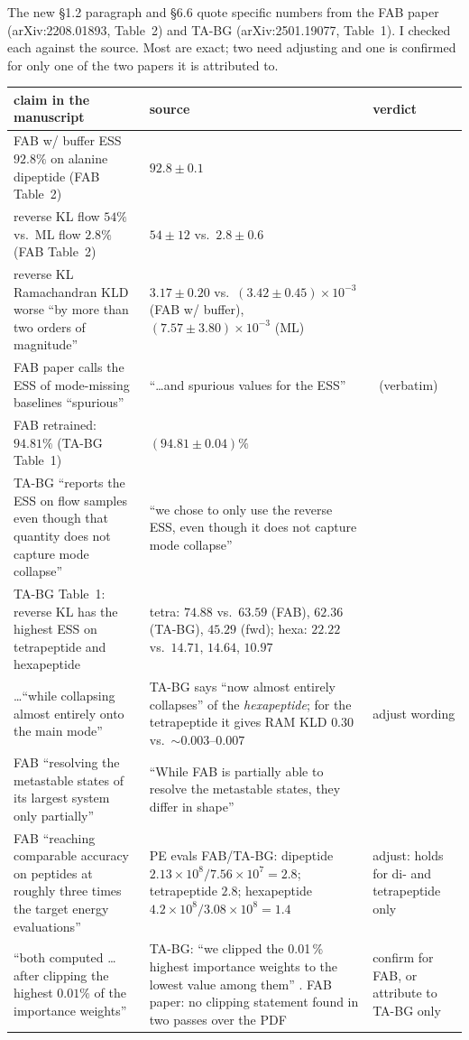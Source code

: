 \documentclass[11pt]{article}
\newcommand{\ok}{\textcolor{green!50!black}{\ding{51}}}
\begin{document}
The new \S1.2 paragraph and \S6.6 quote specific numbers from
the FAB paper (arXiv:2208.01893, Table~2) and TA-BG (arXiv:2501.19077, Table~1).
I checked each against the source. Most are exact; two need adjusting and one
is confirmed for only one of the two papers it is attributed to.

\begin{center}
\small
\setlength{\tabcolsep}{4pt}
\begin{longtable}{@{}p{}p{}p{}@{}}
\toprule
claim in the manuscript & source & verdict \\
\midrule
\endhead
FAB w/ buffer ESS $92.8\%$ on alanine dipeptide (FAB Table~2) & $92.8\pm0.1$ & \ok \\
reverse KL flow $54\%$ vs.\ ML flow $2.8\%$ (FAB Table~2) & $54\pm12$ vs.\ $2.8\pm0.6$ & \ok \\
reverse KL Ramachandran KLD worse ``by more than two orders of magnitude'' & $3.17\pm0.20$ vs.\ $(3.42\pm0.45)\times10^{-3}$ (FAB w/ buffer), $(7.57\pm3.80)\times10^{-3}$ (ML) & \ok \\
FAB paper calls the ESS of mode-missing baselines ``spurious'' & ``\dots and spurious values for the ESS'' & \ok\ (verbatim) \\
FAB retrained: $94.81\%$ (TA-BG Table~1) & $(94.81\pm0.04)\%$ & \ok \\
TA-BG ``reports the ESS on flow samples even though that quantity does not capture mode collapse'' & ``we chose to only use the reverse ESS, even though it does not capture mode collapse'' & \ok \\
TA-BG Table~1: reverse KL has the highest ESS on tetrapeptide and hexapeptide & tetra: $74.88$ vs.\ $63.59$ (FAB), $62.36$ (TA-BG), $45.29$ (fwd); hexa: $22.22$ vs.\ $14.71$, $14.64$, $10.97$ & \ok \\
\dots ``while collapsing almost entirely onto the main mode'' & TA-BG says ``now almost entirely collapses'' of the \emph{hexapeptide}; for the tetrapeptide it gives RAM KLD $0.30$ vs.\ $\sim\!0.003$--$0.007$ & adjust wording \\
FAB ``resolving the metastable states of its largest system only partially'' & ``While FAB is partially able to resolve the metastable states, they differ in shape'' & \ok \\
FAB ``reaching comparable accuracy on peptides at roughly three times the target energy evaluations'' & PE evals FAB/TA-BG: dipeptide $2.13{\times}10^8/7.56{\times}10^7=2.8$; tetrapeptide $2.8$; hexapeptide $4.2{\times}10^8/3.08{\times}10^8=1.4$ & adjust: holds for di- and tetrapeptide only \\
``both computed \dots after clipping the highest $0.01\%$ of the importance weights'' & TA-BG: ``we clipped the 0.01\,\% highest importance weights to the lowest value among them'' \ok. FAB paper: no clipping statement found in two passes over the PDF & confirm for FAB, or attribute to TA-BG only \\
\bottomrule
\end{longtable}
\end{center}
\end{document}
